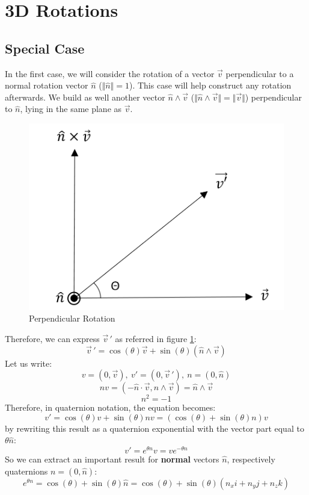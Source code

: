 \documentclass[10pt,a4paper]{article}
\begin{document}
\section{3D Rotations}
\subsection{Special Case}
In the first case, we will consider the rotation of a vector $\vec{v}$ perpendicular to a normal rotation vector $\hat{n}$ ($\Vert\hat{n}\Vert = 1$). This case will help construct any rotation afterwards. We build as well another vector $\hat{n}\wedge\vec{v}$ ($\Vert\hat{n}\wedge\vec{v}\Vert = \Vert\vec{v}\Vert$) perpendicular to $\hat{n}$, lying in the same plane as $\vec{v}$. 
\begin{figure}[htp]
\centering
\includegraphics[scale=0.3]{nv.PNG}
\caption{Perpendicular Rotation}
\label{nv}
\end{figure}

Therefore, we can express $\vec{v}\,'$ as referred in figure \ref{nv}: 
$$
\boxed{
\vec{v}\,' = \cos(\theta)\vec{v} + \sin(\theta)(\hat{n}\wedge\vec{v})
}
$$
Let us write:
$$
v = (0,\vec{v}), \: v' = (0,\vec{v}\,'), \: n = (0,\hat{n})
$$
$$
nv = (-\hat{n}\cdot\vec{v}, \hat{n}\wedge\vec{v}) = \hat{n}\wedge\vec{v}
$$
$$
n^2 = -1
$$
Therefore, in quaternion notation, the equation becomes:
$$
v' = \cos(\theta)v + \sin(\theta)nv = \left(\cos(\theta) + \sin(\theta)n\right)v
$$
by rewriting this result as a quaternion exponential with the vector part equal to $\theta\hat{n}$:
$$
\boxed{
v' = e^{\theta n}v = ve^{-\theta n}
}
$$
So we can extract an important result for \textbf{normal} vectors $\hat{n}$, respectively quaternions $n = (0,\hat{n})$: 
$$
\boxed{
e^{\theta n} = \cos(\theta) + \sin(\theta)\hat{n} 
			 = \cos(\theta) + \sin(\theta)(n_xi + n_yj + n_zk)
}
$$
\end{document}
